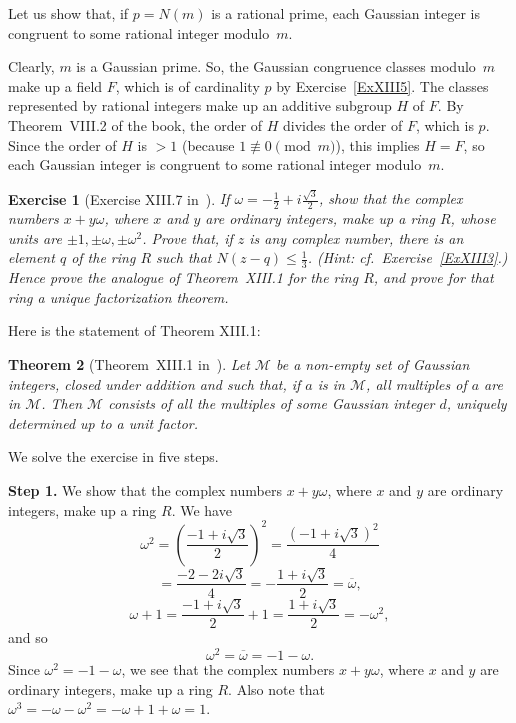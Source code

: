 \documentclass[12pt,letterpaper]{article}
\newtheorem{thm}{Theorem}%
\newtheorem{exer}[thm]{Exercise}
\theoremstyle{definition}
\begin{document}
Let us show that, if $p=N(m)$ is a rational prime, each Gaussian integer is congruent to some rational integer modulo~$m$. 

Clearly, $m$ is a Gaussian prime. So, the Gaussian congruence classes modulo~$m$ make up a field $F$, which is of cardinality $p$ by Exercise~\ref{ExXIII5}. The classes represented by rational integers make up an additive subgroup $H$ of $F$. By Theorem~VIII.2 of the book, the order of $H$ divides the order of $F$, which is $p$. Since the order of $H$ is $>1$ (because $1\not\equiv0\pmod m$), this implies $H=F$, so each Gaussian integer is congruent to some rational integer modulo~$m$. 

\begin{exer}[Exercise XIII.7 in~\cite{weil1979}]\label{ExXIII7}
If $\omega=-\frac{1}{2}+i\frac{\sqrt{3}}{2}$, show that the complex numbers $x+y\omega$, where $x$ and $y$ are ordinary integers, make up a ring $R$, whose units are $\pm 1,\pm\omega,\pm\omega^2$. Prove that, if $z$ is any complex number, there is an element $q$ of the ring $R$ such that $N(z-q)\le\frac{1}{3}$. (Hint: cf.\ Exercise~\ref{ExXIII3}.) Hence prove the analogue of Theorem~XIII.1 for the ring $R$, and prove for that ring a unique factorization theorem.
\end{exer} 

Here is the statement of Theorem XIII.1: 
\begin{thm}[Theorem~XIII.1 in~\cite{weil1979}]\label{T-XIII1}
Let $\mathcal{M}$ be a non-empty set of Gaussian integers, closed under addition and such that, if $a$ is in $\mathcal{M}$, all multiples of $a$ are in $\mathcal{M}$. Then $\mathcal{M}$ consists of all the multiples of some Gaussian integer $d$, uniquely determined up to a unit factor. 
\end{thm}

We solve the exercise in five steps. 

\noindent\textbf{Step 1.} We show that the complex numbers $x+y\omega$, where $x$ and $y$ are ordinary integers, make up a ring $R$. We have 
$$
\omega^2=\left(\frac{-1+i\sqrt{3}}{2}\right)^2=\frac{(-1+i\sqrt{3})^2}{4}
$$ 
$$
=\frac{-2-2i\sqrt{3}}{4}=-\frac{1+i\sqrt{3}}{2}=\overline{\omega},
$$ 
$$
\omega+1=\frac{-1+i\sqrt{3}}{2}+1=\frac{1+i\sqrt{3}}{2}=-\omega^2,
$$ 
and so 
$$
\omega^2=\overline{\omega}=-1-\omega.
$$ 
Since $\omega^2=-1-\omega$, we see that the complex numbers $x+y\omega$, where $x$ and $y$ are ordinary integers, make up a ring $R$. Also note that $\omega^3=-\omega-\omega^2=-\omega+1+\omega=1$. 
\end{document}
